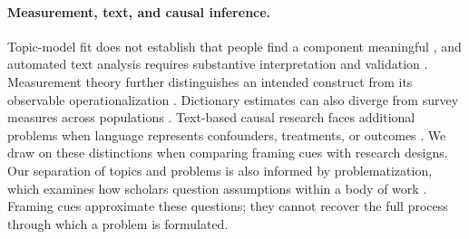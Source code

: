 \paragraph{Measurement, text, and causal inference.}
Topic-model fit does not establish that people find a component meaningful \citep{chang2009}, and automated text analysis requires substantive interpretation and validation \citep{grimmer2013}. Measurement theory further distinguishes an intended construct from its observable operationalization \citep{jacobs2021}. Dictionary estimates can also diverge from survey measures across populations \citep{jaidka2020estimating}. Text-based causal research faces additional problems when language represents confounders, treatments, or outcomes \citep{keith2020}. We draw on these distinctions when comparing framing cues with research designs. Our separation of topics and problems is also informed by problematization, which examines how scholars question assumptions within a body of work \citep{alvesson2011}. Framing cues approximate these questions; they cannot recover the full process through which a problem is formulated.
